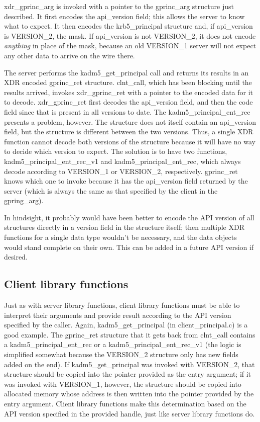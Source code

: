 xdr_gprinc_arg is invoked with a pointer to the gprinc_arg structure
just described.  It first encodes the api_version field; this allows
the server to know what to expect.  It then encodes the krb5_principal
structure and, if api_version is VERSION_2, the mask.  If api_version
is not VERSION_2, it does not encode {\it anything} in place of the
mask, because an old VERSION_1 server will not expect any other data
to arrive on the wire there.

The server performs the kadm5_get_principal call and returns its
results in an XDR encoded gprinc_ret structure.  clnt_call, which has
been blocking until the results arrived, invokes xdr_gprinc_ret with a
pointer to the encoded data for it to decode.  xdr_gprinc_ret first
decodes the api_version field, and then the code field since that is
present in all versions to date.  The kadm5_principal_ent_rec presents
a problem, however.  The structure does not itself contain an
api_version field, but the structure is different between the two
versions.  Thus, a single XDR function cannot decode both versions of
the structure because it will have no way to decide which version to
expect.  The solution is to have two functions,
kadm5_principal_ent_rec_v1 and kadm5_principal_ent_rec, which always
decode according to VERSION_1 or VERSION_2, respectively.  gprinc_ret
knows which one to invoke because it has the api_version field
returned by the server (which is always the same as that specified by
the client in the gpring_arg).

In hindsight, it probably would have been better to encode the API
version of all structures directly in a version field in the structure
itself; then multiple XDR functions for a single data type wouldn't be
necessary, and the data objects would stand complete on their own.
This can be added in a future API version if desired.

\subsection{Client library functions}

Just as with server library functions, client library functions must
be able to interpret their arguments and provide result according to
the API version specified by the caller.  Again, kadm5_get_principal
(in client_principal.c) is a good example.  The gprinc_ret structure
that it gets back from clnt_call contains a kadm5_principal_ent_rec or
a kadm5_principal_ent_rec_v1 (the logic is simplified somewhat because
the VERSION_2 structure only has new fields added on the end).  If
kadm5_get_principal was invoked with VERSION_2, that structure should
be copied into the pointer provided as the entry argument; if it was
invoked with VERSION_1, however, the structure should be copied into
allocated memory whose address is then written into the pointer
provided by the entry argument.  Client library functions make this
determination based on the API version specified in the provided
handle, just like server library functions do.

